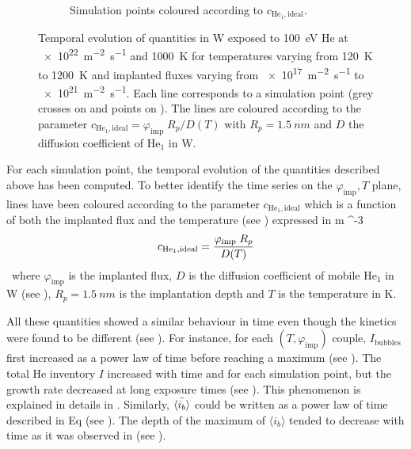 \begin{figure} [ht!]
\begin{subfigure}{0.5\linewidth}
        \caption{Simulation points coloured according to $c_{\mathrm{He}_1, \mathrm{ideal}}$.}
    \end{subfigure}
    \caption{Temporal evolution of quantities in W exposed to \SI{100}{eV} He at \SI{e22}{m^{-2}.s^{-1}} and \SI{1000}{K} for temperatures varying from \SI{120}{K} to \SI{1200}{K} and implanted fluxes varying from \SI{e17}{m^{-2}s^{-1}} to \SI{e21}{m^{-2}s^{-1}}. Each line corresponds to a simulation point (grey crosses on  and points on ). The lines are coloured according to the parameter $c_{\mathrm{He}_1, \mathrm{ideal}} = \varphi_\mathrm{imp} \; R_p/D(T)$ with $R_p = \SI{1.5}{nm}$ and $D$ the diffusion coefficient of $\mathrm{He}_1$ in W.}
\end{figure}

For each simulation point, the temporal evolution of the quantities described above has been computed.
To better identify the time series on the $\varphi_\mathrm{imp}, T$ plane, lines have been coloured according to the parameter $c_{\mathrm{He}_1, \mathrm{ideal}}$ which is a function of both the implanted flux and the temperature (see ) expressed in \si{m ^{-3}}.

\begin{equation}
    c_{\mathrm{He}_1, \mathrm{ideal}} = \frac{\varphi_\mathrm{imp} \; R_p}{D(T)}
    \labeq{c he1 ideal}
\end{equation}
where $\varphi_\mathrm{imp}$ is the implanted flux, $D$ is the diffusion coefficient of mobile $\mathrm{He}_1$ in W (see ), $R_p = \SI{1.5}{nm}$ is the implantation depth and $T$ is the temperature in \si{K}.

All these quantities showed a similar behaviour in time even though the kinetics were found to be different (see ).
For instance, for each $(T, \varphi_\mathrm{imp})$ couple, $I_\mathrm{bubbles}$ first increased as a power law of time before reaching a maximum (see ).
The total He inventory $I$ increased with time and for each simulation point, but the growth rate decreased at long exposure times (see ).
This phenomenon is explained in details in .
Similarly, $\Bar{\langle i_b \rangle}$ could be written as a power law of time described in Eq  (see ).
The depth of the maximum of $\langle i_b \rangle$ tended to decrease with time as it was observed in  (see ).



